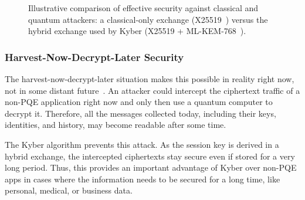 \begin{figure}[htbp]
\centering
{}
\caption{Illustrative comparison of effective security against classical and quantum attackers: a classical-only exchange (X25519~\cite{rfc7748}) versus the hybrid exchange used by Kyber (X25519 + ML-KEM-768~\cite{fips203}).}
\label{fig:result_comparison}
\end{figure}

\subsubsection{Harvest-Now-Decrypt-Later Security}

The harvest-now-decrypt-later situation makes this possible in reality right now, not in some distant future~\cite{bsi_hybrid}. An attacker could intercept the ciphertext traffic of a non-PQE application right now and only then use a quantum computer to decrypt it. Therefore, all the messages collected today, including their keys, identities, and history, may become readable after some time.

The Kyber algorithm prevents this attack. As the session key is derived in a hybrid exchange, the intercepted ciphertexts stay secure even if stored for a very long period. Thus, this provides an important advantage of Kyber over non-PQE apps in cases where the information needs to be secured for a long time, like personal, medical, or business data.

